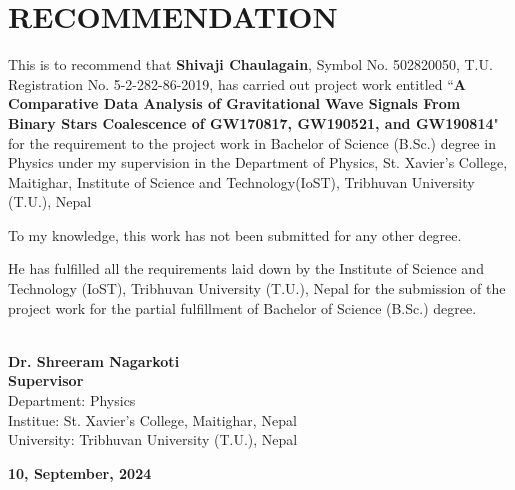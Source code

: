 \chapter*{RECOMMENDATION}
This is to recommend that \textbf{Shivaji Chaulagain}, Symbol No. 502820050, T.U. Registration No. 5-2-282-86-2019, has carried out project work entitled ``\textbf{A Comparative Data Analysis of Gravitational Wave Signals From Binary Stars Coalescence of GW170817, GW190521, and GW190814}" for the requirement to the project work in Bachelor of Science (B.Sc.) degree in Physics under my supervision in the Department of Physics, St. Xavier's College, Maitighar, Institute of Science and Technology(IoST), Tribhuvan University (T.U.), Nepal
\vspace{8pt}

\noindent To my knowledge, this work has not been submitted for any other degree.
\vspace{8pt}

\noindent He has fulfilled all the requirements laid down by the Institute of Science and Technology (IoST), Tribhuvan University (T.U.), Nepal for the submission of the project work for the partial fulfillment of Bachelor of Science (B.Sc.) degree.

\vspace{70pt}
\begin{flushleft}
	\underline{\hspace{5.3cm}} \\
	\textbf{Dr. Shreeram Nagarkoti}\\
	\textbf{Supervisor}\\
	Department: Physics\\
	Institue: St. Xavier's College, Maitighar, Nepal\\
	University: Tribhuvan University (T.U.), Nepal\\
\end{flushleft}
\vspace{80pt}
\begin{center}
	{\fontsize{16}{12}\selectfont \textbf{10, September, 2024}}
\end{center}